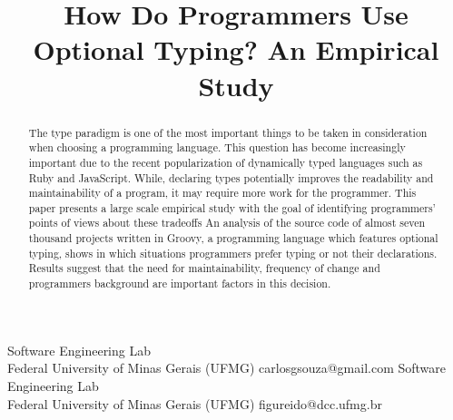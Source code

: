 \documentclass[preprint]{sigplanconf}
\begin{document}
\setlength{\pdfpageheight}{\paperheight}
\setlength{\pdfpagewidth}{\paperwidth}






\title{How Do Programmers Use Optional Typing? An Empirical Study}

           {Software Engineering Lab\\Federal University of Minas Gerais (UFMG)}
           {carlosgsouza@gmail.com}
           {Software Engineering Lab\\Federal University of Minas Gerais (UFMG)}
           {figureido@dcc.ufmg.br}

\maketitle

\begin{abstract}
The type paradigm is one of the most important things to be taken in consideration when choosing a programming language. 
This question has become increasingly important due to the recent popularization of dynamically typed languages such as Ruby and JavaScript. 
While, declaring types potentially improves the readability and maintainability of a program, it may require more work for the
programmer.
This paper presents a large scale empirical study with the goal of identifying programmers' points of views about these tradeoffs
An analysis of the source code of almost seven thousand projects written in Groovy, a programming language which features optional typing, shows in which situations programmers prefer typing or not their declarations. 
Results suggest that the need for maintainability, frequency of change and programmers background are important factors in this decision.
\end{abstract}
\end{document}
